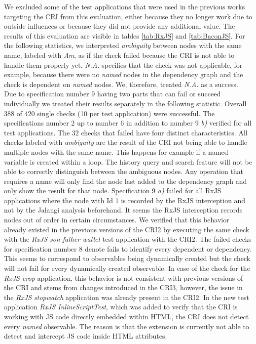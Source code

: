 We excluded some of the test applications that were used in the previous works targeting the CRI from this evaluation, either because they no longer work due to outside influences or because they did not provide any additional value. The results of this evaluation are visible in tables \ref{tab:RxJS} and \ref{tab:BaconJS}. For the following statistics, we interpreted \emph{ambiguity} between nodes with the same name, labeled with \emph{Am}, as if the check failed because the CRI is not able to handle them properly yet. \emph{N.A.} specifies that the check was not applicable, for example, because there were no \emph{named} nodes in the dependency graph and the check is dependent on \emph{named} nodes. We, therefore, treated \emph{N.A.} as a success. Due to specification number 9 having two parts that can fail or succeed individually we treated their results separately in the following statistic. Overall 388 of 420 single checks (10 per test application) were successful. The specifications number 2 up to number 6 in addition to number 9 \emph{b)} verified for all test applications. The 32 checks that failed have four distinct characteristics. All checks labeled with \emph{ambiguity} are the result of the CRI not being able to handle multiple nodes with the same name. This happens for example if a named variable is created within a loop. The history query and search feature will not be able to correctly distinguish between the ambiguous nodes. Any operation that requires a name will only find the node last added to the dependency graph and only show the result for that node. Specification 9 \emph{a)} failed for all RxJS applications where the node with Id 1 is recorded by the RxJS interception and not by the Jalangi analysis beforehand. It seems the RxJS interception records nodes out of order in certain circumstances. We verified that this behavior already existed in the previous versions of the CRI2 by executing the same check with the \emph{RxJS son-father-wallet} test application with the CRI2. The failed checks for specification number 8 denote fails to identify every dependent or dependency. This seems to correspond to observables being dynamically created but the check will not fail for every dynamically created observable. In case of the check for the \emph{RxJS crop} application, this behavior is not consistent with previous versions of the CRI and stems from changes introduced in the CRI3, however, the issue in the \emph{RxJS stopwatch} application was already present in the CRI2.
In the new test application \emph{RxJS InlineScriptTest}, which was added to verify that the CRI is working with JS code directly embedded within HTML, the CRI does not detect every \emph{named} observable. The reason is that the extension is currently not able to detect and intercept JS code inside HTML attributes.
